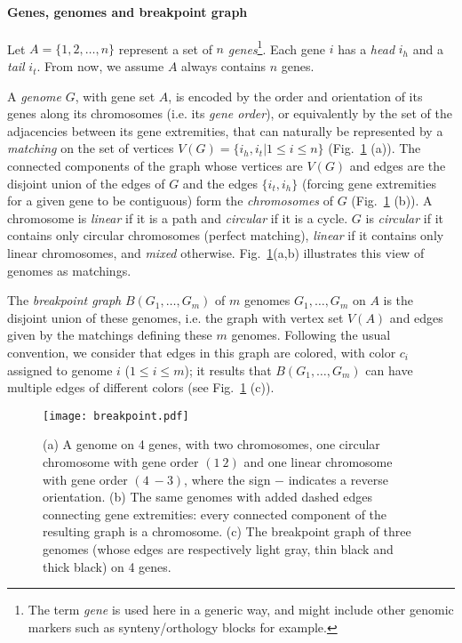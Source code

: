 \documentclass[10pt]{llncs}
\begin{document}
\paragraph{Genes, genomes and breakpoint graph}
Let $A = \{1, 2, \ldots, n\}$ represent a set of $n$ {\em
  genes}\footnote{The term {\em gene} is used here in a generic way,
  and might include other genomic markers such as synteny/orthology
  blocks for example.}. Each gene $i$ has a {\em head} $i_h$ and a
{\em tail} $i_t$. From now, we assume $A$ always contains $n$ genes.

A {\em genome} $G$, with gene set $A$, is encoded by the order and
orientation of its genes along its chromosomes (i.e. its {\em gene
  order}), or equivalently by the set of the adjacencies between its
gene extremities, that can naturally be represented by a {\em
  matching} on the set of vertices $V(G) = \{i_h, i_t | 1\leq i \leq n
\}$ (Fig.~\ref{genomebreak} (a)). The connected components of the
graph whose vertices are $V(G)$ and edges are the disjoint union of
the edges of $G$ and the edges $\{i_t, i_h\}$ (forcing gene
extremities for a given gene to be contiguous) form the {\em
  chromosomes} of $G$ (Fig.~\ref{genomebreak} (b)). A chromosome is
\emph{linear} if it is a path and \emph{circular} if it is a
cycle. $G$ is {\em circular} if it contains only circular chromosomes
(perfect matching), {\em linear} if it contains only linear
chromosomes, and {\em mixed} otherwise.  Fig.~\ref{genomebreak}(a,b)
illustrates this view of genomes as matchings.

The {\em breakpoint graph} $B(G_1, \ldots, G_m)$ of $m$ genomes $G_1,
\ldots, G_m$ on $A$ is the disjoint union of these genomes, i.e. the
graph with vertex set $V(A)$ and edges given by the matchings defining
these $m$ genomes. Following the usual convention, we consider that
edges in this graph are colored, with color $c_i$ assigned to genome
$i$ ($1 \leq i \leq m$); it results that $B(G_1, \ldots, G_m)$ can
have multiple edges of different colors (see Fig.~\ref{genomebreak}
(c)). 

\begin{figure}
\begin{center}
  \texttt{[image: breakpoint.pdf]}
 \vspace*{-3mm}\caption{(a) A genome on 4 genes, with two chromosomes,
   one circular chromosome with gene order $(1\ 2)$ and one linear
   chromosome with gene order $(4\ -3)$, where the sign $-$ indicates
   a reverse orientation. (b) The same genomes with added dashed edges
   connecting gene extremities: every connected component of the
   resulting graph is a chromosome. (c) The breakpoint graph of three
   genomes (whose edges are respectively light gray, thin black and
   thick black) on 4 genes.}
    \label{genomebreak}
\end{center}

\end{figure}
\end{document}
